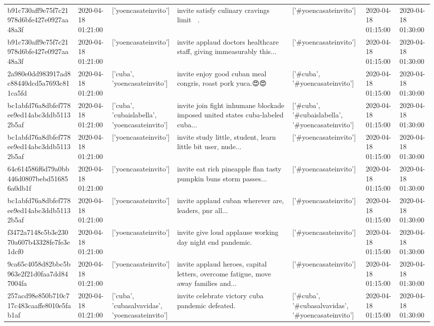 \begin{tabular}{lllllll}
b91c730aff9e75f7c21978d6bfe427e0927aa48a3f & 2020-04-18 01:21:00 & ['yoencasateinvito'] & invite satisfy culinary cravings limit 🤣🤣. & ['#yoencasateinvito'] & 2020-04-18 01:15:00 & 2020-04-18 01:30:00 \\
b91c730aff9e75f7c21978d6bfe427e0927aa48a3f & 2020-04-18 01:21:00 & ['yoencasateinvito'] & invite applaud doctors healthcare staff, giving immeasurably this... & ['#yoencasateinvito'] & 2020-04-18 01:15:00 & 2020-04-18 01:30:00 \\
2a980e0dd983917ad8c88440dcd5a7693c811ca5fd & 2020-04-18 01:21:00 & ['cuba', 'yoencasateinvito'] & invite enjoy good cuban meal congris, roast pork yuca.😍😍 & ['#cuba', '#yoencasateinvito'] & 2020-04-18 01:15:00 & 2020-04-18 01:30:00 \\
bc1abfd76a8dbfef778ee9ed14abc3ddb51132b5af & 2020-04-18 01:21:00 & ['cuba', 'cubaislabella', 'yoencasateinvito'] & invite join fight inhumane blockade imposed united states cuba-labeled cuba... & ['#cuba', '#cubaislabella', '#yoencasateinvito'] & 2020-04-18 01:15:00 & 2020-04-18 01:30:00 \\
bc1abfd76a8dbfef778ee9ed14abc3ddb51132b5af & 2020-04-18 01:21:00 & ['yoencasateinvito'] & invite study little, student, learn little bit user, nude... & ['#yoencasateinvito'] & 2020-04-18 01:15:00 & 2020-04-18 01:30:00 \\
64c614586f6d79a0bb446d0807bebd516856a0db1f & 2020-04-18 01:21:00 & ['yoencasateinvito'] & invite eat rich pineapple flan tasty pumpkin buns storm passes... & ['#yoencasateinvito'] & 2020-04-18 01:15:00 & 2020-04-18 01:30:00 \\
bc1abfd76a8dbfef778ee9ed14abc3ddb51132b5af & 2020-04-18 01:21:00 & ['yoencasateinvito'] & invite applaud cuban wherever are, leaders, pnr all... & ['#yoencasateinvito'] & 2020-04-18 01:15:00 & 2020-04-18 01:30:00 \\
f3472a7148c5b3e23070a607b43328fe7fe3e1dcf0 & 2020-04-18 01:21:00 & ['yoencasateinvito'] & invite give loud applause working day night end pandemic. & ['#yoencasateinvito'] & 2020-04-18 01:15:00 & 2020-04-18 01:30:00 \\
9ca65c4058d82bbc5b963e2f21d0faa7dd847004fa & 2020-04-18 01:21:00 & ['yoencasateinvito'] & invite applaud heroes, capital letters, overcome fatigue, move away families and... & ['#yoencasateinvito'] & 2020-04-18 01:15:00 & 2020-04-18 01:30:00 \\
257acd98e850b710c717c483caaffe8010e5fab1af & 2020-04-18 01:21:00 & ['cuba', 'cubasalvavidas', 'yoencasateinvito'] & invite celebrate victory cuba pandemic defeated. & ['#cuba', '#cubasalvavidas', '#yoencasateinvito'] & 2020-04-18 01:15:00 & 2020-04-18 01:30:00 \\

\end{tabular}
